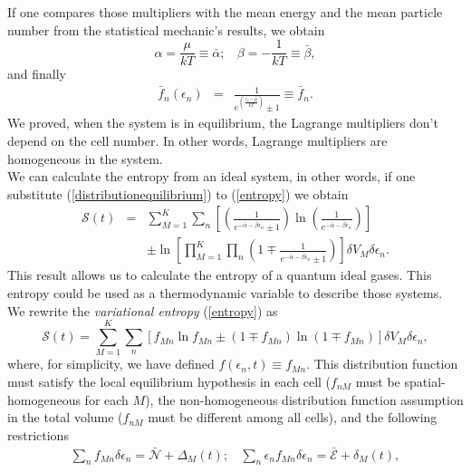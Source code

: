 \documentclass{article}
\newcommand{\de}{\delta}
\newcommand{\Ss}{\mathcal{S}}
\begin{document}
If one compares those multipliers with the mean energy and the mean particle number from the statistical mechanic's results, we obtain
\begin{equation}
    \alpha=\frac{\mu}{kT}\equiv \bar{\alpha}; \ \ \ \ \beta=-\frac{1}{kT}\equiv \bar{\beta},
\end{equation}{}
and finally
\begin{eqnarray}
    \bar{f}_{n}(\epsilon_{n})&=&\frac{1}{e^{(\frac{{\epsilon_n}-\bar{\mu}}{kT})}\pm 1}\equiv \bar{f}_{n}.
\end{eqnarray}{}
We proved, when the system is in equilibrium, the Lagrange multipliers don't depend on the cell number. In other words, Lagrange multipliers are homogeneous in the system.\\
We can calculate the entropy from an ideal system, in other words, if one substitute (\ref{distributionequilibrium}) to (\ref{entropy}) we obtain
\begin{eqnarray}
      \Ss(t)&=&\sum_{M=1}^{K} \sum_n  \left[\left(\frac{1}{e^{-\bar{\alpha}-\bar{\beta}\epsilon_{n}}\pm 1} \right)\ln \left(\frac{1}{e^{-\bar{\alpha}-\bar{\beta}\epsilon_{n}}} \right) \right]\nonumber \\
      &&\pm  \ln \left[\prod_{M=1}^{K} \prod_{n}\left(1 \mp \frac{1}{e^{-\bar{\alpha}-\bar{\beta}\epsilon_{n}}\pm 1} \right) \right] \de V_M \delta \epsilon_n\label{H-entropy}.
  \end{eqnarray}
  This result allows us to calculate the entropy of a quantum ideal gases. This entropy could be used as a thermodynamic variable to describe those systems.\\
We rewrite the \textit{variational entropy} (\ref{entropy}) as
\begin{equation}
    \Ss(t)=\sum_{M=1}^{K} \sum_{n} \left[ f_{Mn} \ln f_{Mn} \pm (1 \mp f_{Mn}) \ln (1 \mp f_{Mn}) \right] \de V_M \delta \epsilon_n \label{entropy2},
\end{equation}
where, for simplicity, we have defined $f(\epsilon_{n},t)\equiv f_{Mn}$.
This distribution function must satisfy the local equilibrium hypothesis in each cell ($f_{nM}$ must be spatial-homogeneous for each $M$), the non-homogeneous distribution function assumption in the total volume ($f_{nM}$ must be different among all cells), and the following restrictions
\begin{eqnarray}
        \sum_{n}f_{Mn} \delta \epsilon_n=\bar{\mathcal{N}}+\Delta_M(t); \ \ \ \ \sum_{n}\epsilon_{n}f_{Mn} \delta \epsilon_n=\bar{\mathcal{E}}+ \delta_M(t), \label{restrictionoutside}
  \end{eqnarray}
\end{document}
